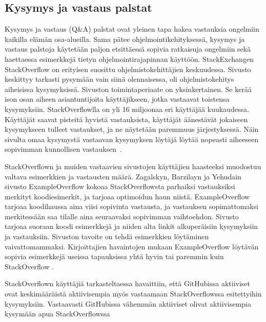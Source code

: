 \documentclass[finnish]{../tktltiki2}
\theoremstyle{definition}
\theoremstyle{remark}
\begin{document}
\subsection{Kysymys ja vastaus palstat}
Kysymys ja vastaus (Q\&A) palstat ovat yleinen tapa hakea vastauksia ongelmiin kaikilla elämän osa-alueilla. Sama pätee ohjelmointikehityksessä, kysymys ja vastaus palstoja käytetään paljon etsittäessä sopivia ratkaisuja ongelmiin sekä haettaessa esimerkkejä tietyn ohjelmointirajapinnan käyttöön. StackExchangen StackOverflow on erityisen suosittu ohjelmistokehittäjien keskuudessa. Sivusto keskittyy tarkasti pysymään vain siinä olennaisessa, oli ohjelmistokehitys aiheisissa kysymyksissä. Sivuston toimintaperiaate on yksinkertainen. Se kerää ison osan aiheen asiantuntijoita käyttäjikseen, jotka vastaavat toistensa kysymyksiin. StackOverflowlla on yli 16 miljoonaa eri käyttäjää kuukaudessa. Käyttäjät saavat pisteitä hyvistä vastauksista, käyttäjät äänestävät jokaiseen kysymykseen tulleet vastaukset, ja ne näytetään paremmuus järjestyksessä. Näin sivulta omaa kysymystä vastaavan kysymyksen löytäjä löytää nopeasti aiheeseen sopivimman kunnollisen vastauksen~\cite{social-networking-meets-se}.

StackOverflown ja muiden vastaavien sivustojen käyttäjien haasteeksi muodostuu valtava esimerkkien ja vastausten määrä. Zagalskyn, Barzilayn ja Yehudain sivusto ExampleOverflow kokoaa StackOverflowsta parhaiksi vastauksiksi merkityt koodiesimerkit, ja tarjoaa optimoidun haun niistä. ExampleOverflow tarjoaa koodihaussa aina viisi sopivinta vastausta, ja vastauksen sopimattomaksi merkitessään saa tilalle aina seuraavaksi sopivimman vaihtoehdon. Sivusto tarjoaa suoraan koodi esimerkkejä ja niiden alta linkit alkuperäisiin kysymyksiin ja vastauksiin. Sivuston tavoite on tehdä esimerkkien löytäminen vaivattomammaksi. Kirjoittajien havaintojen mukaan ExampleOverflow löytävän sopivia esimerkkejä useissa tapauksissa yhtä hyvin tai paremmin kuin StackOverflow \cite{example-overflow-social-media-for-code-recommendations}.

StackOverflown käyttäjiä tarkasteltaessa havaittiin, että GitHubissa aktiiviset ovat keskimääräistä aktiivisempia myös vastaamaan StackOverflowssa esitettyihin kysymyksiin. Vastaavasti GitHubissa vähemmän aktiiviset olivat aktiivisempia kysymään apua StackOverflowssa~\cite{stackoverflow-and-github}

\end{document}
